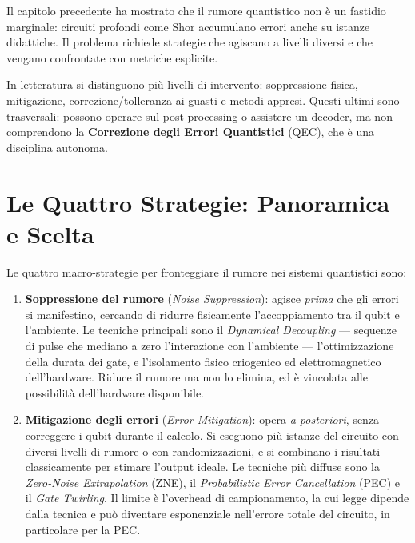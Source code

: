 \begin{onehalfspace}

Il capitolo precedente ha mostrato che il rumore quantistico non è un fastidio marginale: circuiti profondi come Shor accumulano errori anche su istanze didattiche. Il problema richiede strategie che agiscano a livelli diversi e che vengano confrontate con metriche esplicite.

In letteratura si distinguono più livelli di intervento: soppressione fisica, mitigazione, correzione/tolleranza ai guasti e metodi appresi. Questi ultimi sono trasversali: possono operare sul post-processing o assistere un decoder, ma non comprendono la \textbf{Correzione degli Errori Quantistici} (\ac{QEC}), che è una disciplina autonoma.

\section{Le Quattro Strategie: Panoramica e Scelta}

Le quattro macro-strategie per fronteggiare il rumore nei sistemi quantistici sono:

\begin{enumerate}
    \item \textbf{Soppressione del rumore} (\textit{Noise Suppression}): agisce \textit{prima} che gli errori si manifestino, cercando di ridurre fisicamente l'accoppiamento tra il qubit e l'ambiente. Le tecniche principali sono il \textit{Dynamical Decoupling} --- sequenze di pulse che mediano a zero l'interazione con l'ambiente --- l'ottimizzazione della durata dei gate, e l'isolamento fisico criogenico ed elettromagnetico dell'hardware. Riduce il rumore ma non lo elimina, ed è vincolata alle possibilità dell'hardware disponibile.

    \item \textbf{Mitigazione degli errori} (\textit{Error Mitigation}): opera \textit{a posteriori}, senza correggere i qubit durante il calcolo. Si eseguono più istanze del circuito con diversi livelli di rumore o con randomizzazioni, e si combinano i risultati classicamente per stimare l'output ideale. Le tecniche più diffuse sono la \textit{Zero-Noise Extrapolation} (ZNE), il \textit{Probabilistic Error Cancellation} (PEC) e il \textit{Gate Twirling}. Il limite è l'overhead di campionamento, la cui legge dipende dalla tecnica e può diventare esponenziale nell'errore totale del circuito, in particolare per la PEC.


\end{enumerate}
\end{onehalfspace}
